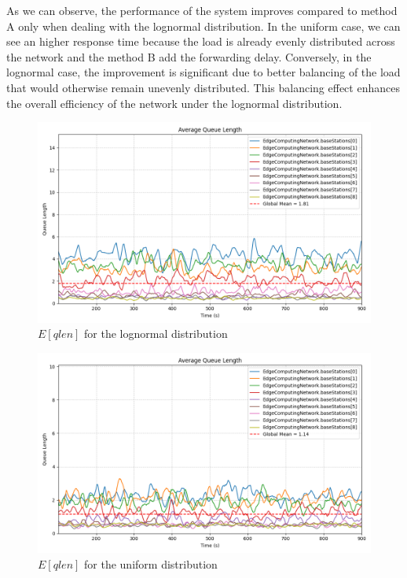 \documentclass{report}
\begin{document}
As we can observe, the performance of the system improves compared to method A only when dealing with the lognormal distribution. In the uniform case, we can see an higher response time because the load is already evenly distributed across the network and the method B add the forwarding delay. Conversely, in the lognormal case, the improvement is significant due to better balancing of the load that would otherwise remain unevenly distributed. This balancing effect enhances the overall efficiency of the network under the lognormal distribution.

\begin{figure}[H]
    \centering
    \includegraphics[width=\textwidth]{img/plots/log_1e3_B/qlen.png}
    \caption{$E[qlen]$ for the lognormal distribution}
\end{figure}

\begin{figure}[H]
    \centering
    \includegraphics[width=\textwidth]{img/plots/uni_1e3_B/qlen.png}
    \caption{$E[qlen]$ for the uniform distribution}
\end{figure}
\end{document}
